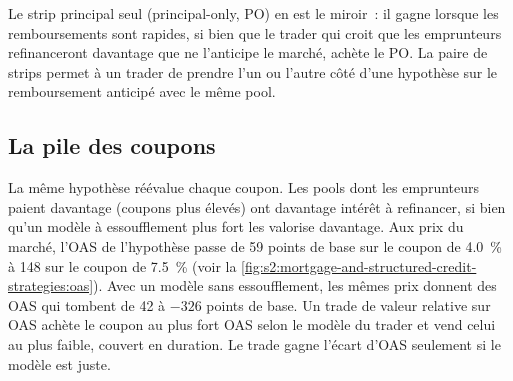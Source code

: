 \begin{omfigure}

\label{fig:s2:mortgage-and-structured-credit-strategies:io}
\end{omfigure}

Le strip principal seul (principal-only, PO) en est le miroir~: il gagne lorsque les remboursements sont rapides, si bien que le trader qui croit que les emprunteurs refinanceront davantage
que ne l'anticipe le marché, achète le PO. La paire de strips permet à un trader de prendre l'un ou l'autre côté d'une hypothèse sur le remboursement anticipé avec le même pool.

\subsection*{La pile des coupons}

La même hypothèse réévalue chaque coupon. Les pools dont les emprunteurs paient davantage (coupons plus élevés) ont davantage intérêt à refinancer, si bien qu'un modèle à essoufflement plus
fort les valorise davantage. Aux prix du marché, l'OAS de l'hypothèse passe de 59 points de base sur le coupon de 4.0~\% à 148 sur le coupon de 7.5~\%
(voir la \cref{fig:s2:mortgage-and-structured-credit-strategies:oas}). Avec un modèle sans essoufflement, les mêmes prix donnent des OAS qui tombent de 42 à $-326$
points de base. Un trade de valeur relative sur OAS achète le coupon au plus fort OAS selon le modèle du trader et vend celui au plus faible, couvert en duration. Le
trade gagne l'écart d'OAS seulement si le modèle est juste.

